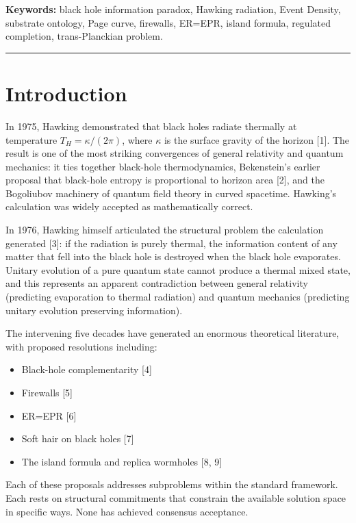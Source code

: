 \documentclass[11pt,a4paper]{article}
\begin{document}
\textbf{Keywords:} black hole information paradox, Hawking radiation, Event Density, substrate ontology, Page curve, firewalls, ER=EPR, island formula, regulated completion, trans-Planckian problem.

\begin{center}\rule{0.5\textwidth}{0.4pt}\end{center}

\section{Introduction}

In 1975, Hawking demonstrated that black holes radiate thermally at temperature $T_H = \kappa/(2\pi)$, where $\kappa$ is the surface gravity of the horizon [1]. The result is one of the most striking convergences of general relativity and quantum mechanics: it ties together black-hole thermodynamics, Bekenstein's earlier proposal that black-hole entropy is proportional to horizon area [2], and the Bogoliubov machinery of quantum field theory in curved spacetime. Hawking's calculation was widely accepted as mathematically correct.

In 1976, Hawking himself articulated the structural problem the calculation generated [3]: if the radiation is purely thermal, the information content of any matter that fell into the black hole is destroyed when the black hole evaporates. Unitary evolution of a pure quantum state cannot produce a thermal mixed state, and this represents an apparent contradiction between general relativity (predicting evaporation to thermal radiation) and quantum mechanics (predicting unitary evolution preserving information).

The intervening five decades have generated an enormous theoretical literature, with proposed resolutions including:
\begin{itemize}[noitemsep]
  \item Black-hole complementarity [4]
  \item Firewalls [5]
  \item ER=EPR [6]
  \item Soft hair on black holes [7]
  \item The island formula and replica wormholes [8, 9]
\end{itemize}

Each of these proposals addresses subproblems within the standard framework. Each rests on structural commitments that constrain the available solution space in specific ways. None has achieved consensus acceptance.
\end{document}
